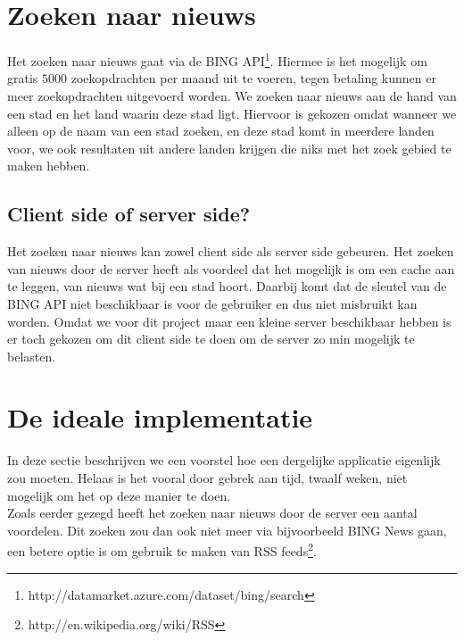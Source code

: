 \documentclass[twoside,openright]{uva-bachelor-thesis}
\begin{document}
	\section{Zoeken naar nieuws}
		Het zoeken naar nieuws gaat via de BING API\footnote{http://datamarket.azure.com/dataset/bing/search}. Hiermee is het mogelijk om gratis $5000$ zoekopdrachten per maand uit te voeren, tegen betaling kunnen er meer zoekopdrachten uitgevoerd worden. We zoeken naar nieuws aan de hand van een stad en het land waarin deze stad ligt. Hiervoor is gekozen omdat wanneer we alleen op de naam van een stad zoeken, en deze stad komt in meerdere landen voor, we ook resultaten uit andere landen krijgen die niks met het zoek gebied te maken hebben. 
		\subsection{Client side of server side?}
			Het zoeken naar nieuws kan zowel client side als server side gebeuren.
			Het zoeken van nieuws door de server heeft als voordeel dat het mogelijk is om een cache aan te leggen, van nieuws wat bij een stad hoort. Daarbij komt dat de sleutel van de BING API niet beschikbaar is voor de gebruiker en dus niet misbruikt kan worden. 
			Omdat we voor dit project maar een kleine server beschikbaar hebben is er toch gekozen om dit client side te doen om de server zo min mogelijk te belasten.
	\section{De ideale implementatie}
		In deze sectie beschrijven we een voorstel hoe een dergelijke applicatie eigenlijk zou moeten. Helaas is het vooral door gebrek aan tijd, twaalf weken, niet mogelijk om het op deze manier te doen. 
		\\[0.5cm]
		Zoals eerder gezegd heeft het zoeken naar nieuws door de server een aantal voordelen. Dit zoeken zou dan ook niet meer via bijvoorbeeld BING News gaan, een betere optie is om gebruik te maken van RSS feeds\footnote{http://en.wikipedia.org/wiki/RSS}.
\end{document}
